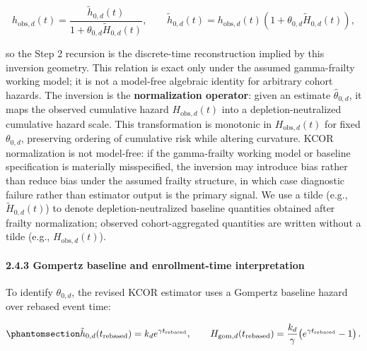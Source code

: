 \documentclass[
]{article}
\begin{document}
\[
h_{\mathrm{obs},d}(t)=\frac{\tilde h_{0,d}(t)}{1+\theta_{0,d}\tilde H_{0,d}(t)},
\qquad
\tilde h_{0,d}(t)=h_{\mathrm{obs},d}(t)\left(1+\theta_{0,d}\tilde H_{0,d}(t)\right),
\]

so the Step 2 recursion is the discrete-time reconstruction implied by
this inversion geometry. This relation is exact only under the assumed
gamma-frailty working model; it is not a model-free algebraic identity
for arbitrary cohort hazards. The inversion is the \textbf{normalization
operator}: given an estimate \(\hat{\theta}_{0,d}\), it maps the
observed cumulative hazard \(H_{\mathrm{obs},d}(t)\) into a
depletion-neutralized cumulative hazard scale. This transformation is
monotonic in \(H_{\mathrm{obs},d}(t)\) for fixed \(\theta_{0,d}\),
preserving ordering of cumulative risk while altering curvature. KCOR
normalization is not model-free: if the gamma-frailty working model or
baseline specification is materially misspecified, the inversion may
introduce bias rather than reduce bias under the assumed frailty
structure, in which case diagnostic failure rather than estimator output
is the primary signal. We use a tilde (e.g., \(\tilde H_{0,d}(t)\)) to
denote depletion-neutralized baseline quantities obtained after frailty
normalization; observed cohort-aggregated quantities are written without
a tilde (e.g., \(H_{\mathrm{obs},d}(t)\)).

\paragraph{2.4.3 Gompertz baseline and enrollment-time
interpretation}\label{gompertz-baseline-and-enrollment-time-interpretation}

To identify \(\theta_{0,d}\), the revised KCOR estimator uses a Gompertz
baseline hazard over rebased event time:

\begin{equation}\protect\phantomsection\label{eq:baseline-shape-default}{
\tilde h_{0,d}(t_{\mathrm{rebased}})=k_d e^{\gamma t_{\mathrm{rebased}}},
\qquad
H_{\mathrm{gom},d}(t_{\mathrm{rebased}})=\frac{k_d}{\gamma}\!\left(e^{\gamma t_{\mathrm{rebased}}}-1\right).
}\end{equation}
\end{document}
